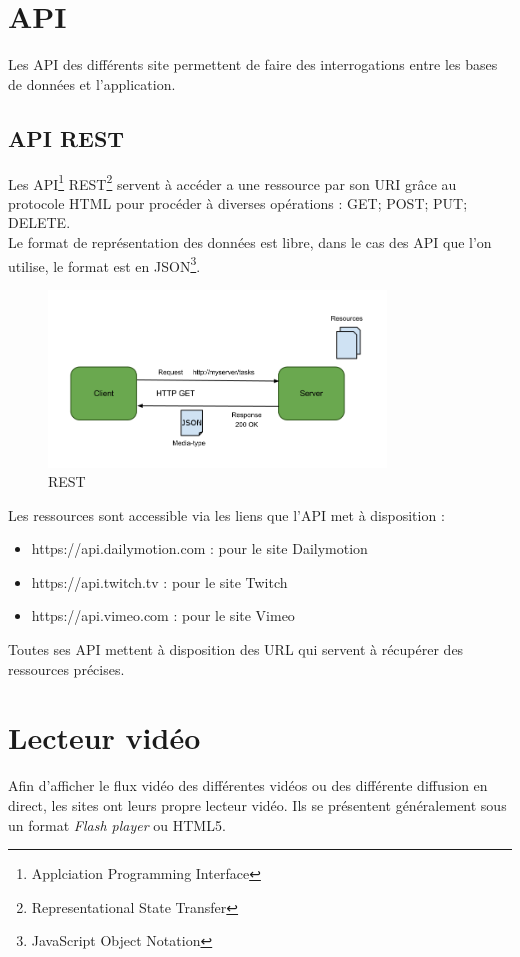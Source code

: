 \documentclass[11pt]{report} %
\begin{document}
	\section{API}
	Les API des différents site permettent de faire des interrogations entre les bases de données et l'application.
		\subsection{API REST}
		Les API\footnote{Applciation Programming Interface} REST\footnote{Representational State Transfer} servent à accéder a une ressource par son URI grâce au protocole HTML pour procéder à diverses opérations : GET; POST; PUT; DELETE. \\		
		Le format de représentation des données est libre, dans le cas des API que l'on utilise, le format est en JSON\footnote{JavaScript Object Notation}.
		
		\begin{figure}[h]
			\center
			\includegraphics[width=0.8\textwidth]{../img/rest.png}
			\caption{REST}
			\label{rest}
		\end{figure}
		
		\noindent
		Les ressources sont accessible via les liens que l'API met à disposition :

		\begin{itemize}
		\item https://api.dailymotion.com : pour le site Dailymotion
		\item https://api.twitch.tv : pour le site Twitch
		\item https://api.vimeo.com : pour le site Vimeo
		\end{itemize}
		
		Toutes ses API mettent à disposition des URL qui servent à récupérer des ressources précises. 
		
		
	\section{Lecteur vidéo}
	Afin d'afficher le flux vidéo des différentes vidéos ou des différente diffusion en direct, les sites ont leurs propre lecteur vidéo.
	Ils se présentent généralement sous un format \textit{Flash player} ou HTML5.
	
\end{document}
